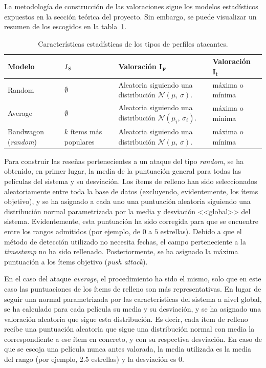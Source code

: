 La metodología de construcción de las valoraciones sigue los modelos estadísticos expuestos en la sección teórica del proyecto. Sin embargo, se puede visualizar un resumen de los escogidos en la tabla~\ref{ataques_coforest}.

\begin{table}
\begin{centering}
	\begin{tabular}{@{}p{5em} p{6em} p{11em} p{8em}@{}}
		\toprule
		\textbf{Modelo} & $\hfil{I_S}$ & \textbf{Valoración} $\mathbf{I_F}$ &  \textbf{Valoración} $\mathbf{I_t}$\\ 
		\midrule
		Random & $\hfil\emptyset$ & Aleatoria siguiendo una distribución $\mathcal{N}(\mu,\,\sigma)$. & máxima o mínima \\
		Average & $\hfil\emptyset$ & Aleatoria siguiendo una distribución $\mathcal{N}(\mu_i,\,\sigma_i)$. & máxima o mínima\\
		Bandwagon (\textit{random}) &\centering$k$ ítems más populares & Aleatoria siguiendo una distribución $\mathcal{N}(\mu,\,\sigma)$. & máxima o mínima\\
		\bottomrule
	\end{tabular}
	\caption[Experimentación: características de ataques a detectar]{Características estadísticas de los tipos de perfiles atacantes.}
	\label{ataques_coforest}	
\end{centering}
\end{table}

Para construir las reseñas pertenecientes a un ataque del tipo \textit{random}, se ha obtenido, en primer lugar, la media de la puntuación general para todas las películas del sistema y su desviación. Los ítems de relleno han sido seleccionados aleatoriamente entre toda la base de datos (excluyendo, evidentemente, los ítems objetivo), y se ha asignado a cada uno una puntuación aleatoria siguiendo una distribución normal parametrizada por la media y desviación <<global>> del sistema. Evidentemente, esta puntuación ha sido corregida para que se encuentre entre los rangos admitidos (por ejemplo, de $0$ a $5$ estrellas). Debido a que el método de detección utilizado no necesita fechas, el campo perteneciente a la \textit{timestamp} no ha sido rellenado. Posteriormente, se ha asignado la máxima puntuación a los ítems objetivo (\textit{push attack}).

En el caso del ataque \textit{average}, el procedimiento ha sido el mismo, solo que en este caso las puntuaciones de los ítems de relleno son más representativas. En lugar de seguir una normal parametrizada por las características del sistema a nivel global, se ha calculado para cada película su media y su desviación, y se ha asignado una valoración aleatoria que sigue esta distribución. Es decir, cada ítem de relleno recibe una puntuación aleatoria que sigue una distribución normal con media la correspondiente a ese ítem en concreto, y con su respectiva desviación. En caso de que se escoja una película nunca antes valorada, la media utilizada es la media del rango (por ejemplo, 2.5 estrellas) y la desviación es $0$.

